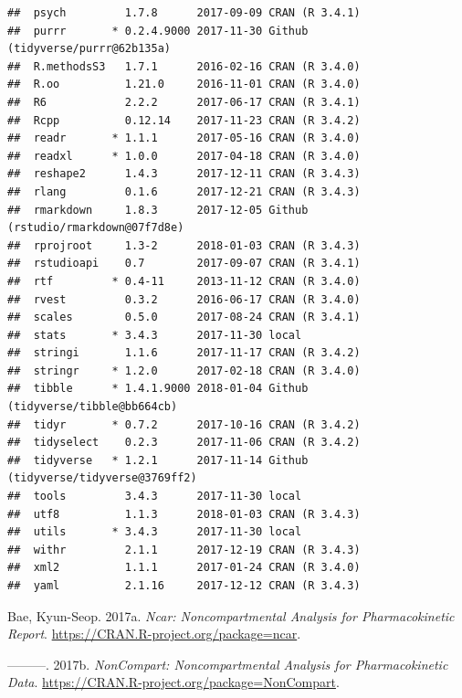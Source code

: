 \documentclass[12pt,]{krantz}
\theoremstyle{definition}
\theoremstyle{definition}
\theoremstyle{definition}
\theoremstyle{remark}
\begin{document}
\begin{verbatim}
##  psych         1.7.8      2017-09-09 CRAN (R 3.4.1)                      
##  purrr       * 0.2.4.9000 2017-11-30 Github (tidyverse/purrr@62b135a)    
##  R.methodsS3   1.7.1      2016-02-16 CRAN (R 3.4.0)                      
##  R.oo          1.21.0     2016-11-01 CRAN (R 3.4.0)                      
##  R6            2.2.2      2017-06-17 CRAN (R 3.4.1)                      
##  Rcpp          0.12.14    2017-11-23 CRAN (R 3.4.2)                      
##  readr       * 1.1.1      2017-05-16 CRAN (R 3.4.0)                      
##  readxl      * 1.0.0      2017-04-18 CRAN (R 3.4.0)                      
##  reshape2      1.4.3      2017-12-11 CRAN (R 3.4.3)                      
##  rlang         0.1.6      2017-12-21 CRAN (R 3.4.3)                      
##  rmarkdown     1.8.3      2017-12-05 Github (rstudio/rmarkdown@07f7d8e)  
##  rprojroot     1.3-2      2018-01-03 CRAN (R 3.4.3)                      
##  rstudioapi    0.7        2017-09-07 CRAN (R 3.4.1)                      
##  rtf         * 0.4-11     2013-11-12 CRAN (R 3.4.0)                      
##  rvest         0.3.2      2016-06-17 CRAN (R 3.4.0)                      
##  scales        0.5.0      2017-08-24 CRAN (R 3.4.1)                      
##  stats       * 3.4.3      2017-11-30 local                               
##  stringi       1.1.6      2017-11-17 CRAN (R 3.4.2)                      
##  stringr     * 1.2.0      2017-02-18 CRAN (R 3.4.0)                      
##  tibble      * 1.4.1.9000 2018-01-04 Github (tidyverse/tibble@bb664cb)   
##  tidyr       * 0.7.2      2017-10-16 CRAN (R 3.4.2)                      
##  tidyselect    0.2.3      2017-11-06 CRAN (R 3.4.2)                      
##  tidyverse   * 1.2.1      2017-11-14 Github (tidyverse/tidyverse@3769ff2)
##  tools         3.4.3      2017-11-30 local                               
##  utf8          1.1.3      2018-01-03 CRAN (R 3.4.3)                      
##  utils       * 3.4.3      2017-11-30 local                               
##  withr         2.1.1      2017-12-19 CRAN (R 3.4.3)                      
##  xml2          1.1.1      2017-01-24 CRAN (R 3.4.0)                      
##  yaml          2.1.16     2017-12-12 CRAN (R 3.4.3)
\end{verbatim}

\hypertarget{refs}{}
\hypertarget{ref-R-ncar}{}
Bae, Kyun-Seop. 2017a. \emph{Ncar: Noncompartmental Analysis for
Pharmacokinetic Report}. \url{https://CRAN.R-project.org/package=ncar}.

\hypertarget{ref-R-NonCompart}{}
---------. 2017b. \emph{NonCompart: Noncompartmental Analysis for
Pharmacokinetic Data}.
\url{https://CRAN.R-project.org/package=NonCompart}.
\end{document}
